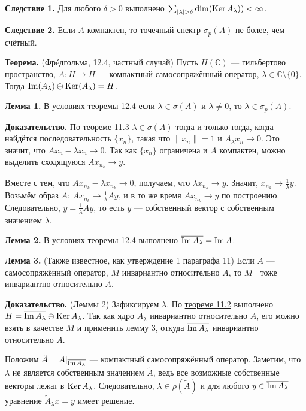 \QED

\textbf{Следствие 1.} Для любого $\delta > 0$ выполнено $\sum_{|\lambda| > \delta} \dim(\operatorname{Ker} A_\lambda)) < \infty$.

\textbf{Следствие 2.} Если $A$ компактен, то точечный спектр $\sigma_p(A)$ не более, чем счётный.

\label{th:12-4} \textbf{Теорема.} (Фрéдгольма, 12.4, частный случай)
Пусть $H(\mathbb C)$ --- гильбертово пространство, $A: H \to H$ --- компактный самосопряжённый оператор, $\lambda \in \mathbb C \setminus \{0\}$.
Тогда $\operatorname{Im}(A_\lambda) \oplus \operatorname{Ker}(A_\lambda) = H$.

\textbf{Лемма 1.} В условиях теоремы 12.4 если $\lambda \in \sigma(A)$ и $\lambda \ne 0$, то $\lambda \in \sigma_p(A)$.

\textbf{Доказательство.} По \hyperref[th:11-3]{теореме 11.3} $\lambda \in \sigma(A)$ тогда и только тогда, когда найдётся последовательность $\{x_n\}$, такая что $\|x_n\| = 1$ и $A_\lambda x_n \to 0$.
Это значит, что $Ax_n - \lambda x_n \to 0$.
Так как $\{x_n\}$ ограничена и $A$ компактен, можно выделить сходящуюся $A x_{n_k} \to y$.

Вместе с тем, что $Ax_{n_k} - \lambda x_{n_k} \to 0$, получаем, что $\lambda x_{n_k} \to y$.
Значит, $x_{n_k} \to \frac{1}{\lambda} y$.
Возьмём образ $A$: $Ax_{n_k} \to \frac{1}{\lambda} A y$, и в то же время $Ax_{n_k} \to y$ по построению.
Следовательно, $y = \frac{1}{\lambda} Ay$, то есть $y$ --- собственный вектор с собственным значением $\lambda$.

\QED

\textbf{Лемма 2.} В условиях теоремы 12.4 выполнено $\overline{\operatorname{Im} A_\lambda} = \operatorname{Im} A$.

\textbf{Лемма 3.} (Также известное, как утверждение 1 параграфа 11) Если $A$ --- самосопряжённый оператор, $M$ инвариантно относительно $A$, то $M^\bot$ тоже инвариантно относительно $A$.

\textbf{Доказательство.} (Леммы 2) Зафиксируем $\lambda$.
По \hyperref[th:11-2]{теореме 11.2} выполнено $H = \overline{\operatorname{Im} A_\lambda} \oplus \operatorname{Ker} A_\lambda$.
Так как ядро $A_\lambda$ инвариантно относительно $A$, его можно взять в качестве $M$ и применить лемму 3, откуда $\overline{\operatorname{Im} A_\lambda}$ инвариантно относительно $A$.

Положим $\tilde A = A|_{\overline{\operatorname{Im} A_\lambda}}$ --- компактный самосопряжённый оператор.
Заметим, что $\lambda$ не является собственным значением $\tilde A$, ведь все возможные собственные векторы лежат в $\operatorname{Ker} A_\lambda$.
Следовательно, $\lambda \in \rho(\tilde A)$ и для любого $y \in \overline{\operatorname{Im} A_\lambda}$ уравнение $\tilde A_\lambda x = y$ имеет решение.

